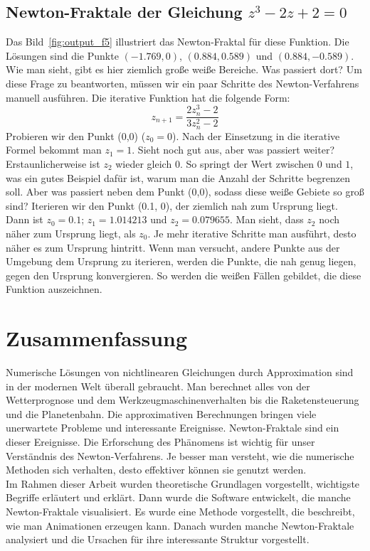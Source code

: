 \documentclass[a4paper,12pt]{llncs}
\numberwithin{equation}{section}
\begin{document}
\subsection{Newton-Fraktale der Gleichung $z^3 - 2z + 2 = 0$}
Das Bild~\ref{fig:output_f5} illustriert das Newton-Fraktal für diese Funktion.
Die Lösungen sind die Punkte $(-1.769,0)$, $(0.884,0.589)$ und $(0.884,-0.589)$.
Wie man sieht, gibt es hier ziemlich große weiße Bereiche. 
Was passiert dort?
Um diese Frage zu beantworten, müssen wir ein paar Schritte des Newton-Verfahrens manuell ausführen.
Die iterative Funktion hat die folgende Form:
\[
z_{n+1} = \frac{2z_n^3-2}{3z_n^2-2}
\]
Probieren wir den Punkt (0,0) ($z_0 = 0$).
Nach der Einsetzung in die iterative Formel bekommt man $z_1 = 1$.
Sieht noch gut aus, aber was passiert weiter?
Erstaunlicherweise ist $z_2$ wieder gleich $0$.
So springt der Wert zwischen $0$ und $1$, was ein gutes Beispiel dafür ist, warum man die Anzahl der Schritte begrenzen soll.
Aber was passiert neben dem Punkt (0,0), sodass diese weiße Gebiete so groß sind?
Iterieren wir den Punkt (0.1, 0), der ziemlich nah zum Ursprung liegt.
Dann ist $z_0=0.1$; $z_1= 1.014213$ und $z_2= 0.079655$.
Man sieht, dass $z_2$ noch näher zum Ursprung liegt, als $z_0$.
Je mehr iterative Schritte man ausführt, desto näher es zum Ursprung hintritt.
Wenn man versucht, andere Punkte aus der Umgebung dem Ursprung zu iterieren, werden die Punkte, die nah genug liegen, gegen den Ursprung konvergieren.
So werden die weißen Fällen gebildet, die diese Funktion auszeichnen.

\section{Zusammenfassung}
Numerische Lösungen von nichtlinearen Gleichungen durch Approximation sind in der modernen Welt überall gebraucht.
Man berechnet alles von der Wetterprognose und dem Werkzeugmaschinenverhalten bis die Raketensteuerung und die Planetenbahn.
Die approximativen Berechnungen bringen viele unerwartete Probleme und interessante Ereignisse.
Newton-Fraktale sind ein dieser Ereignisse. 
Die Erforschung des Phänomens ist wichtig für unser Verständnis des Newton-Verfahrens. 
Je besser man versteht, wie die numerische Methoden sich verhalten, desto effektiver können sie genutzt werden.\\
Im Rahmen dieser Arbeit wurden theoretische Grundlagen vorgestellt, wichtigste Begriffe erläutert und erklärt.
Dann wurde die Software entwickelt, die manche Newton-Fraktale visualisiert.
Es wurde eine Methode vorgestellt, die beschreibt, wie man Animationen erzeugen kann.
Danach wurden manche Newton-Fraktale analysiert und die Ursachen für ihre interessante Struktur vorgestellt.
\newpage

 

\end{document}
